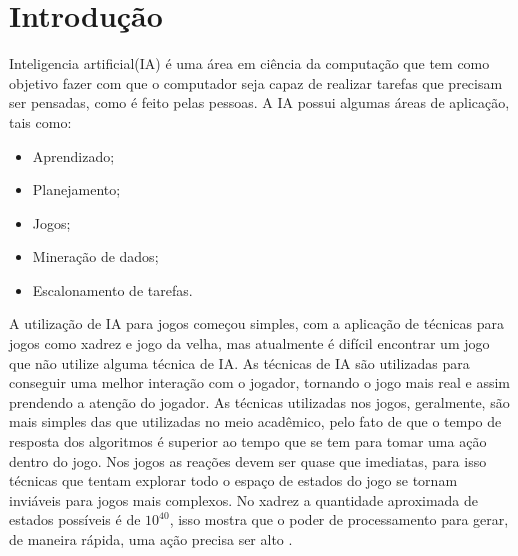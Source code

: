 \chapter{\label{chap:intro}Introdução}



Inteligencia artificial(IA) é uma área em ciência da computação que tem como objetivo fazer com que o computador seja capaz de realizar tarefas que precisam ser pensadas, como é feito pelas pessoas.  
A IA possui algumas áreas de aplicação, tais como: %
\begin{itemize}
	\item Aprendizado;
	\item Planejamento;
	\item Jogos;
	\item Mineração de dados;
	\item Escalonamento de tarefas.
\end{itemize}


A utilização de IA para jogos começou simples, com a aplicação de técnicas para jogos como xadrez e jogo da velha, mas atualmente é difícil encontrar um jogo que não utilize alguma técnica de IA. As técnicas de IA são utilizadas para conseguir uma melhor interação com o jogador, tornando o jogo mais real e assim prendendo a atenção do jogador. As técnicas utilizadas nos jogos, geralmente, são mais simples das que utilizadas no meio acadêmico, pelo fato de que o tempo de resposta dos algoritmos é superior ao tempo que se tem para tomar uma ação dentro do jogo. Nos jogos as reações devem ser quase que imediatas, para isso técnicas que tentam explorar todo o espaço de estados do jogo se tornam inviáveis para jogos mais complexos. No xadrez a quantidade aproximada de estados possíveis é de $10^{40}$, isso mostra que o poder de processamento para gerar, de maneira rápida, uma ação precisa ser alto \cite{millington2009artificial}. \\


